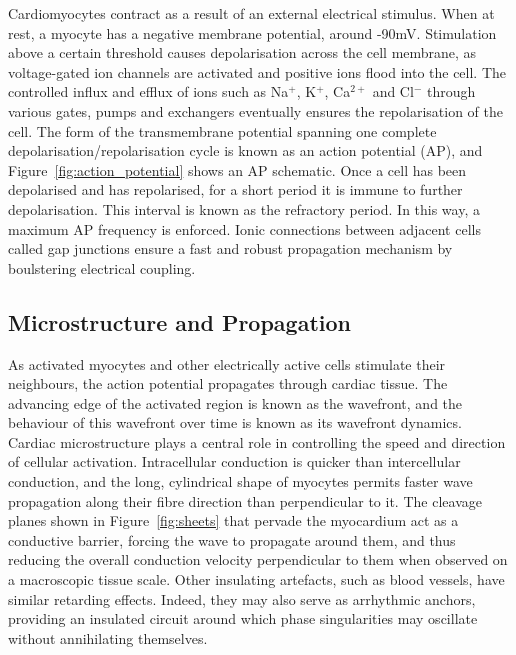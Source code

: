     Cardiomyocytes contract as a result of an external electrical stimulus. When at rest, a myocyte has a negative membrane potential, around -90mV. Stimulation above a certain threshold causes depolarisation across the cell membrane, as voltage-gated ion channels are activated and positive ions flood into the cell. The controlled influx and efflux of ions such as Na$^+$, K$^+$, Ca$^{2+}$ and Cl$^-$ through various gates, pumps and exchangers eventually ensures the repolarisation of the cell. The form of the transmembrane potential spanning one complete depolarisation/repolarisation cycle is known as an action potential (AP), and Figure~\ref{fig:action_potential} shows an AP schematic. Once a cell has been depolarised and has repolarised, for a short period it is immune to further depolarisation. This interval is known as the refractory period. In this way, a maximum AP frequency is enforced. Ionic connections between adjacent cells called gap junctions ensure a fast and robust propagation mechanism by boulstering electrical coupling.
  
  \subsection{Microstructure and Propagation}
  \label{sub:microstructure_and_propagation}
    As activated myocytes and other electrically active cells stimulate their neighbours, the action potential propagates through cardiac tissue. The advancing edge of the activated region is known as the wavefront, and the behaviour of this wavefront over time is known as its wavefront dynamics. Cardiac microstructure plays a central role in controlling the speed and direction of cellular activation. Intracellular conduction is quicker than intercellular conduction, and the long, cylindrical shape of myocytes permits faster wave propagation along their fibre direction than perpendicular to it. The cleavage planes shown in Figure~\ref{fig:sheets} that pervade the myocardium act as a conductive barrier, forcing the wave to propagate around them, and thus reducing the overall conduction velocity perpendicular to them when observed on a macroscopic tissue scale. Other insulating artefacts, such as blood vessels, have similar retarding effects. Indeed, they may also serve as arrhythmic anchors, providing an insulated circuit around which phase singularities may oscillate without annihilating themselves.
    
